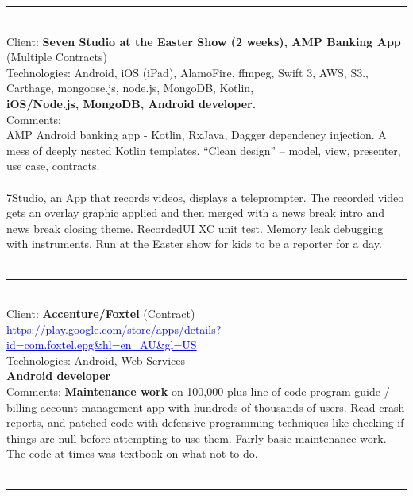 \documentclass{article}
\begin{document}
\noindent\hfil\rule{0.5\textwidth}{.4pt}\hfil
\\


Client: 	\textbf  { Seven Studio at the Easter Show (2 weeks),  AMP Banking App} (Multiple Contracts)  \\
Technologies: 	Android, iOS (iPad), AlamoFire, ffmpeg, Swift 3, AWS, S3., Carthage, mongoose.js, node.js, MongoDB, Kotlin,  \\
\textbf{ 		iOS/Node.js, MongoDB, Android developer. } \\
Comments:	\\ 
AMP Android banking app  - Kotlin, RxJava, Dagger dependency injection.  A mess of deeply nested Kotlin templates. “Clean design” – model, view, presenter, use case, contracts. \\
\\
7Studio, an App that records videos, displays a teleprompter. The recorded video gets an overlay graphic applied and then merged with a news break intro and news break closing theme. RecordedUI XC unit test. Memory leak debugging with instruments. Run at the Easter show for kids to be a reporter for a day. \\
\\

\noindent\hfil\rule{0.5\textwidth}{.4pt}\hfil
\\

Client: 	\textbf  {Accenture/Foxtel} (Contract) \\
\textcolor{blue}{ \underline{https://play.google.com/store/apps/details?id=com.foxtel.epg\&hl=en\_AU\&gl=US } }  \\
Technologies: 	Android, Web Services \\
\textbf{ 		Android developer  } \\
Comments:	{\bf Maintenance work} on 100,000 plus line of code program guide / billing-account management app with hundreds of thousands of users. Read crash reports, and patched code with defensive programming techniques like checking if things are null before attempting to use them. Fairly basic maintenance work. The code at times was textbook on what not to do. \\
\\

\noindent\hfil\rule{0.5\textwidth}{.4pt}\hfil
\\
\end{document}
